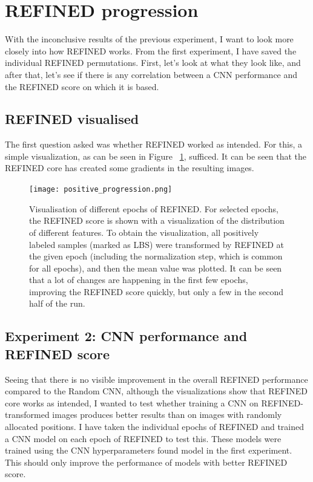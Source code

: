 \section{REFINED progression}
With the inconclusive results of the previous experiment, I want to look more closely into how REFINED works. From the first experiment, I have saved the individual REFINED permutations. First, let's look at what they look like, and after that, let's see if there is any correlation between a CNN performance and the REFINED score on which it is based.

\subsection{REFINED visualised}

The first question asked was whether REFINED worked as intended. For this, a simple visualization, as can be seen in Figure ~\ref{fig:REFINED_visualized}, sufficed. It can be seen that the REFINED core has created some gradients in the resulting images. 

\begin{figure}
    \centering
    \texttt{[image: positive\_progression.png]}
    \caption{Visualisation of different epochs of REFINED. For selected epochs, the REFINED score is shown with a visualization of the distribution of different features. To obtain the visualization, all positively labeled samples (marked as LBS) were transformed by REFINED at the given epoch (including the normalization step, which is common for all epochs), and then the mean value was plotted. It can be seen that a lot of changes are happening in the first few epochs, improving the REFINED score quickly, but only a few in the second half of the run.}
    \label{fig:REFINED_visualized}
\end{figure}

\subsection{Experiment 2: CNN performance and REFINED score}

Seeing that there is no visible improvement in the overall REFINED performance compared to the Random CNN, although the visualizations show that REFINED core works as intended, I wanted to test whether training a CNN on REFINED-transformed images produces better results than on images with randomly allocated positions. I have taken the individual epochs of REFINED and trained a CNN model on each epoch of REFINED to test this. These models were trained using the CNN hyperparameters found model in the first experiment. This should only improve the performance of models with better REFINED score.

